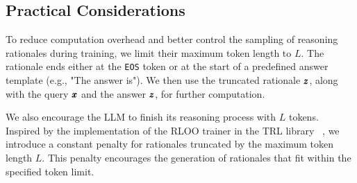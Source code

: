 \fi 

\subsection{Practical Considerations}
\label{sec:sampling_control}
To reduce computation overhead and better control the sampling of reasoning rationales during training, we limit their maximum token length to $L$. The rationale ends either at the \texttt{EOS} token or at the start of a predefined answer template (e.g., "The answer is"). We then use the truncated rationale $\pmb{z}$, along with the query $\pmb{x}$ and the answer $\pmb{z}$, for further computation.

We also encourage the LLM to finish its reasoning process with $L$ tokens. 
Inspired by the implementation of the RLOO trainer in the TRL library~\citep{vonwerra2022trl} , we introduce a constant penalty for rationales truncated by the maximum token length $L$. This penalty encourages the generation of rationales that fit within the specified token limit.

